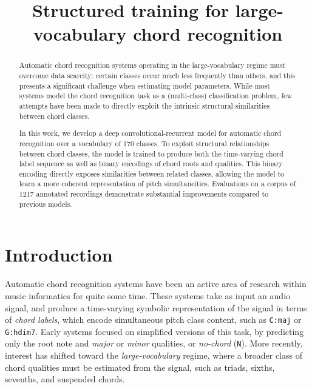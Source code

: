 \documentclass{article}
\title{Structured training for large-vocabulary chord recognition}
\begin{document}
%
\maketitle
%
\begin{abstract}
Automatic chord recognition systems operating in the large-vocabulary regime must overcome data scarcity: certain classes occur much less frequently than others, and this presents a significant challenge when estimating model parameters.
While most systems model the chord recognition task as a (multi-class) classification problem, few attempts have been made to directly exploit the intrinsic structural similarities between chord classes.

In this work, we develop a deep convolutional-recurrent model for automatic chord recognition over a vocabulary of 170 classes.
To exploit structural relationships between chord classes, the model is trained to produce both the time-varying chord label sequence as well as binary encodings of chord roots and qualities.
This binary encoding directly exposes similarities between related classes, allowing the model to learn a more coherent representation of pitch simultaneities.
Evaluations on a corpus of 1217 annotated recordings demonstrate substantial improvements compared to previous models.
\end{abstract}
%
\section{Introduction}\label{sec:introduction}




Automatic chord recognition systems have been an active area of research within music informatics for quite some time.
These systems take as input an audio signal, and produce a time-varying symbolic representation of the signal in terms of \emph{chord labels}, which encode simultaneous pitch class content, such as \texttt{C:maj} or \texttt{G:hdim7}.
Early systems focused on simplified versions of this task, by predicting only the root note and \emph{major} or \emph{minor} qualities, or \emph{no-chord} (\texttt{N}).
More recently, interest has shifted toward the \emph{large-vocabulary} regime, where a broader class of chord qualities must be estimated from the signal, such as triads, sixths, sevenths, and suspended chords.
\end{document}
